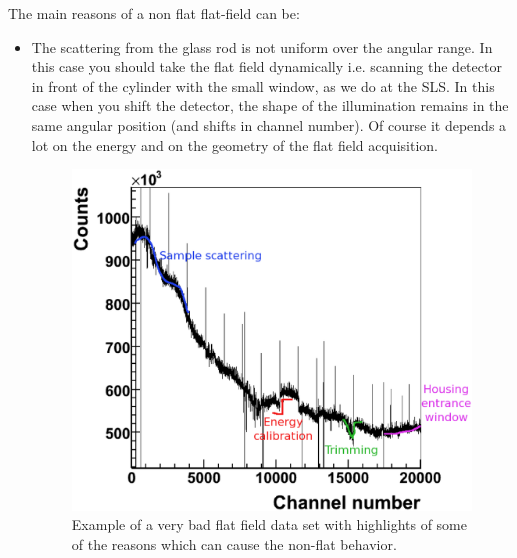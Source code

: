 The main reasons of a non flat flat-field can be:
\begin{itemize}
\item The scattering from the glass rod is not uniform over the angular range. In this case you should take the flat field dynamically i.e. scanning the detector in front of the cylinder with the small window, as we do at the SLS. In this case when you shift the detector, the shape of the illumination remains in the same angular position (and shifts in channel number). Of course it depends a lot on the energy and on the geometry of the flat field acquisition.
\begin{figure}
\begin{center}
\includegraphics[width=\textwidth]{images/bad_ff_col}
\end{center}
\caption{Example of a very bad flat field data set with highlights of some of the reasons which can cause the non-flat behavior.}\label{fig:badff}
\end{figure}


\end{itemize}
